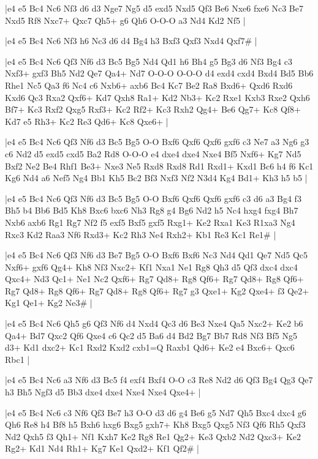 \whitename{}
\blackname{}
\makegametitle
|e4 e5 Bc4 Nc6 Nf3 d6 d3 Nge7 Ng5 d5 exd5 Nxd5 Qf3 Be6 Nxe6 fxe6 Nc3 Be7 Nxd5 Rf8 Nxc7+ Qxc7 Qh5+ g6 Qh6 O-O-O a3 Nd4 Kd2 Nf5  |

\whitename{}
\blackname{}
\makegametitle
|e4 e5 Bc4 Nc6 Nf3 h6 Nc3 d6 d4 Bg4 h3 Bxf3 Qxf3 Nxd4 Qxf7\#  |

\whitename{}
\blackname{}
\makegametitle
|e4 e5 Bc4 Nc6 Qf3 Nf6 d3 Bc5 Bg5 Nd4 Qd1 h6 Bh4 g5 Bg3 d6 Nf3 Bg4 c3 Nxf3+ gxf3 Bh5 Nd2 Qe7 Qa4+ Nd7 O-O-O O-O-O d4 exd4 cxd4 Bxd4 Bd5 Bb6 Rhe1 Nc5 Qa3 f6 Nc4 c6 Nxb6+ axb6 Bc4 Kc7 Be2 Ra8 Bxd6+ Qxd6 Rxd6 Kxd6 Qc3 Rxa2 Qxf6+ Kd7 Qxh8 Ra1+ Kd2 Nb3+ Kc2 Rxe1 Kxb3 Rxe2 Qxh6 Bf7+ Kc3 Rxf2 Qxg5 Rxf3+ Kc2 Rf2+ Kc3 Rxh2 Qg4+ Be6 Qg7+ Kc8 Qf8+ Kd7 e5 Rh3+ Kc2 Re3 Qd6+ Kc8 Qxe6+  |

\whitename{}
\blackname{}
\makegametitle
|e4 e5 Bc4 Nc6 Qf3 Nf6 d3 Bc5 Bg5 O-O Bxf6 Qxf6 Qxf6 gxf6 c3 Ne7 a3 Ng6 g3 c6 Nd2 d5 exd5 cxd5 Ba2 Rd8 O-O-O e4 dxe4 dxe4 Nxe4 Bf5 Nxf6+ Kg7 Nd5 Bxf2 Ne2 Be4 Rhf1 Be3+ Nxe3 Ne5 Rxd8 Rxd8 Rd1 Rxd1+ Kxd1 Bc6 h4 f6 Kc1 Kg6 Nd4 a6 Nef5 Ng4 Bb1 Kh5 Bc2 Bf3 Nxf3 Nf2 N3d4 Kg4 Bd1+ Kh3 h5 b5  |

\whitename{}
\blackname{}
\makegametitle
|e4 e5 Bc4 Nc6 Qf3 Nf6 d3 Bc5 Bg5 O-O Bxf6 Qxf6 Qxf6 gxf6 c3 d6 a3 Bg4 f3 Bh5 b4 Bb6 Bd5 Kh8 Bxc6 bxc6 Nh3 Rg8 g4 Bg6 Nd2 h5 Nc4 hxg4 fxg4 Bh7 Nxb6 axb6 Rg1 Rg7 Nf2 f5 exf5 Bxf5 gxf5 Rxg1+ Ke2 Rxa1 Ke3 R1xa3 Ng4 Rxc3 Kd2 Raa3 Nf6 Rxd3+ Kc2 Rh3 Ne4 Rxh2+ Kb1 Re3 Kc1 Re1\#  |

\whitename{}
\blackname{}
\makegametitle
|e4 e5 Bc4 Nc6 Qf3 Nf6 d3 Be7 Bg5 O-O Bxf6 Bxf6 Nc3 Nd4 Qd1 Qe7 Nd5 Qc5 Nxf6+ gxf6 Qg4+ Kh8 Nf3 Nxc2+ Kf1 Nxa1 Ne1 Rg8 Qh3 d5 Qf3 dxc4 dxc4 Qxc4+ Nd3 Qc1+ Ne1 Nc2 Qxf6+ Rg7 Qd8+ Rg8 Qf6+ Rg7 Qd8+ Rg8 Qf6+ Rg7 Qd8+ Rg8 Qf6+ Rg7 Qd8+ Rg8 Qf6+ Rg7 g3 Qxe1+ Kg2 Qxe4+ f3 Qe2+ Kg1 Qe1+ Kg2 Ne3\#  |

\whitename{}
\blackname{}
\makegametitle
|e4 e5 Bc4 Nc6 Qh5 g6 Qf3 Nf6 d4 Nxd4 Qc3 d6 Be3 Nxe4 Qa5 Nxc2+ Ke2 b6 Qa4+ Bd7 Qxc2 Qf6 Qxe4 c6 Qc2 d5 Ba6 d4 Bd2 Bg7 Bb7 Rd8 Nf3 Bf5 Ng5 d3+ Kd1 dxc2+ Kc1 Rxd2 Kxd2 cxb1=Q Raxb1 Qd6+ Ke2 e4 Bxc6+ Qxc6 Rbc1  |

\whitename{}
\blackname{}
\makegametitle
|e4 e5 Bc4 Nc6 a3 Nf6 d3 Bc5 f4 exf4 Bxf4 O-O c3 Re8 Nd2 d6 Qf3 Bg4 Qg3 Qe7 h3 Bh5 Ngf3 d5 Bb3 dxe4 dxe4 Nxe4 Nxe4 Qxe4+  |

\whitename{}
\blackname{}
\makegametitle
|e4 e5 Bc4 Nc6 c3 Nf6 Qf3 Be7 h3 O-O d3 d6 g4 Be6 g5 Nd7 Qh5 Bxc4 dxc4 g6 Qh6 Re8 h4 Bf8 h5 Bxh6 hxg6 Bxg5 gxh7+ Kh8 Bxg5 Qxg5 Nf3 Qf6 Rh5 Qxf3 Nd2 Qxh5 f3 Qh1+ Nf1 Kxh7 Ke2 Rg8 Re1 Qg2+ Ke3 Qxb2 Nd2 Qxc3+ Ke2 Rg2+ Kd1 Nd4 Rh1+ Kg7 Ke1 Qxd2+ Kf1 Qf2\#  |

